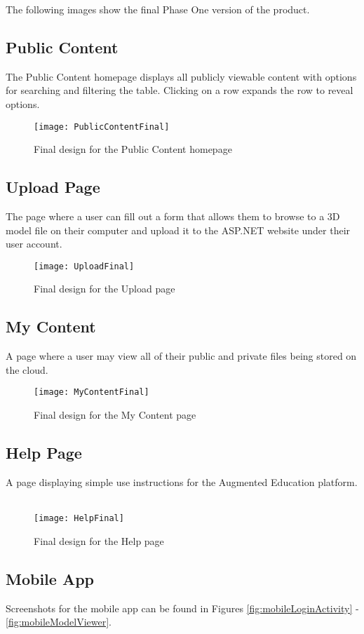 \hspace{7mm}
The following images show the final Phase One version of the product. 
\subsection{Public Content}
    \hspace{7mm} The Public Content homepage displays all publicly viewable content with options for searching and filtering the table. Clicking on a row expands the row to reveal options. 
    \label{fig:final_public_content_page}
    \begin{figure}[H]
        \centering \texttt{[image: PublicContentFinal]}
        \caption{Final design for the Public Content homepage}
    \end{figure}

\subsection{Upload Page}
    \hspace{7mm} The page where a user can fill out a form 
    that allows them to browse to a 3D model file on their computer and upload
    it to the ASP.NET website under their user account.
    \ \\
    \label{fig:final_upload_page}
    \begin{figure}[H]
        \centering \texttt{[image: UploadFinal]}
        \caption{Final design for the Upload page}
    \end{figure}

\subsection{My Content}
    \hspace{7mm}
    A page where a user may view all of their public and private files being stored 
    on the cloud.
    \ \\
    \label{fig:final_my_content_page}
    \begin{figure}[H]
        \centering \texttt{[image: MyContentFinal]}
        \caption{Final design for the My Content page}
    \end{figure}

\subsection{Help Page}
    \hspace{7mm}
    A page displaying simple use instructions for the Augmented Education platform. 
    \ \\
    \label{fig:final_help_page}
    \begin{figure}[H]
        \centering \texttt{[image: HelpFinal]}
        \caption{Final design for the Help page}
    \end{figure}

\subsection{Mobile App}
    \hspace {7mm}
    Screenshots for the mobile app can be found in Figures \ref{fig:mobileLoginActivity} - \ref{fig:mobileModelViewer}.